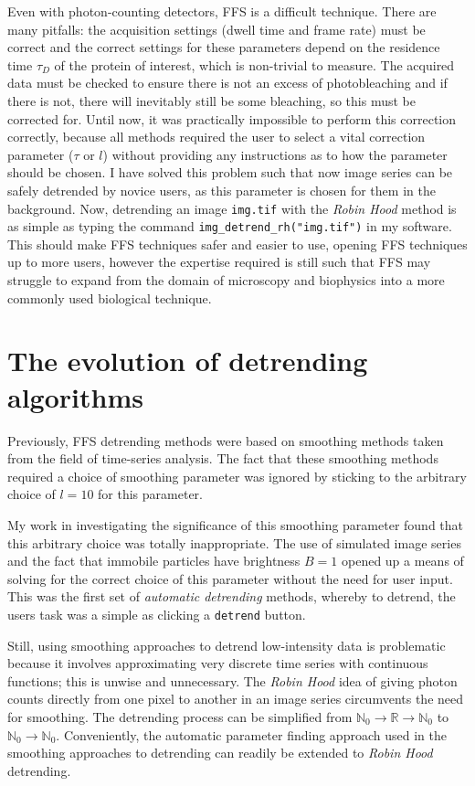 \documentclass[12pt,]{book}
\theoremstyle{definition}
\theoremstyle{definition}
\theoremstyle{definition}
\theoremstyle{remark}
\begin{document}
Even with photon-counting detectors, FFS is a difficult technique. There
are many pitfalls: the acquisition settings (dwell time and frame rate)
must be correct and the correct settings for these parameters depend on
the residence time \(\tau_D\) of the protein of interest, which is
non-trivial to measure. The acquired data must be checked to ensure
there is not an excess of photobleaching and if there is not, there will
inevitably still be some bleaching, so this must be corrected for. Until
now, it was practically impossible to perform this correction correctly,
because all methods required the user to select a vital correction
parameter (\(\tau\) or \(l\)) without providing any instructions as to
how the parameter should be chosen. I have solved this problem such that
now image series can be safely detrended by novice users, as this
parameter is chosen for them in the background. Now, detrending an image
\texttt{img.tif} with the \emph{Robin Hood} method is as simple as
typing the command \texttt{img\_detrend\_rh("img.tif")} in my software.
This should make FFS techniques safer and easier to use, opening FFS
techniques up to more users, however the expertise required is still
such that FFS may struggle to expand from the domain of microscopy and
biophysics into a more commonly used biological technique.

\section{The evolution of detrending
algorithms}\label{the-evolution-of-detrending-algorithms}

Previously, FFS detrending methods were based on smoothing methods taken
from the field of time-series analysis. The fact that these smoothing
methods required a choice of smoothing parameter was ignored by sticking
to the arbitrary choice of \(l=10\) for this parameter.

My work in investigating the significance of this smoothing parameter
found that this arbitrary choice was totally inappropriate. The use of
simulated image series and the fact that immobile particles have
brightness \(B=1\) opened up a means of solving for the correct choice
of this parameter without the need for user input. This was the first
set of \emph{automatic detrending} methods, whereby to detrend, the
users task was a simple as clicking a \texttt{detrend} button.

Still, using smoothing approaches to detrend low-intensity data is
problematic because it involves approximating very discrete time series
with continuous functions; this is unwise and unnecessary. The
\emph{Robin Hood} idea of giving photon counts directly from one pixel
to another in an image series circumvents the need for smoothing. The
detrending process can be simplified from
\(\mathbb{N}_0 \rightarrow \mathbb{R} \rightarrow \mathbb{N}_0\) to
\(\mathbb{N}_0 \rightarrow \mathbb{N}_0\). Conveniently, the automatic
parameter finding approach used in the smoothing approaches to
detrending can readily be extended to \emph{Robin Hood} detrending.
\end{document}
